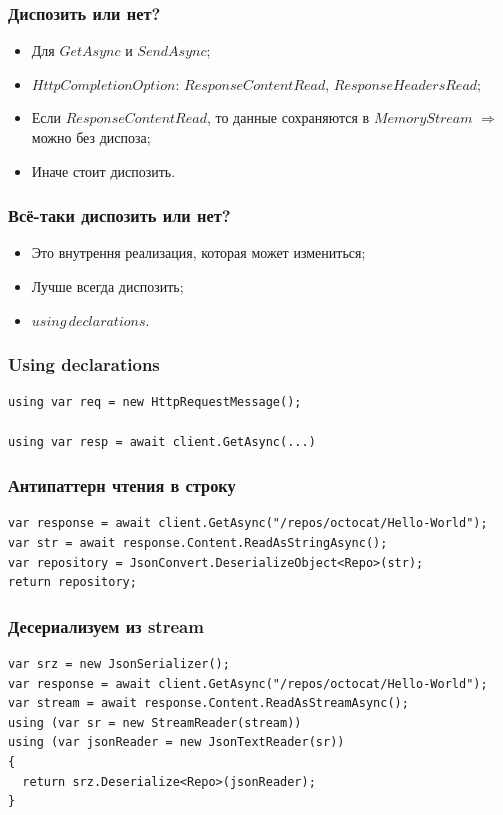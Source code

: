 \documentclass[17pt,aspectratio=169]{beamer}
\begin{document}
\begin{frame}
\frametitle{Диспозить или нет?}
\begin{itemize}
	\item <1-> Для $GetAsync$ и $SendAsync$;
	\item <2-> $HttpCompletionOption$: $ResponseContentRead$, $ResponseHeadersRead$;
	\item <3-> Если $ResponseContentRead$, то данные сохраняются в $MemoryStream$ $\Rightarrow$ можно без диспоза;
	\item <4-> Иначе стоит диспозить. 
\end{itemize}
\end{frame}

\begin{frame}
\frametitle{Всё-таки диспозить или нет?}
\begin{itemize}
	\item <1-> Это внутрення реализация, которая может измениться;
	\item <2-> Лучше всегда диспозить;
	\item <3-> $using\,declarations$.
\end{itemize}
\end{frame}

\begin{frame}[fragile]
\frametitle{Using declarations}
\begin{lstlisting}
using var req = new HttpRequestMessage();

using var resp = await client.GetAsync(...)
\end{lstlisting}
\end{frame}

\begin{frame}[fragile]
\frametitle{Антипаттерн чтения в строку}
\begin{lstlisting}
var response = await client.GetAsync("/repos/octocat/Hello-World");
var str = await response.Content.ReadAsStringAsync();
var repository = JsonConvert.DeserializeObject<Repo>(str);
return repository;
\end{lstlisting}
\end{frame}

\begin{frame}[fragile]
\frametitle{Десериализуем из stream}
\begin{lstlisting}
var srz = new JsonSerializer();
var response = await client.GetAsync("/repos/octocat/Hello-World");
var stream = await response.Content.ReadAsStreamAsync();
using (var sr = new StreamReader(stream))
using (var jsonReader = new JsonTextReader(sr))
{
  return srz.Deserialize<Repo>(jsonReader);
}
\end{lstlisting}
\end{frame}
\end{document}
